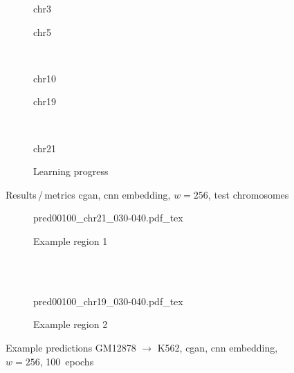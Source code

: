 \begin{figure}[p] %
    \begin{subfigure}{0.45\textwidth}
        \scriptsize
        \caption{chr3}
    \end{subfigure} \hfill
    \begin{subfigure}{0.45\textwidth}
        \scriptsize
        \caption{chr5}
    \end{subfigure}\\[5mm]
    \begin{subfigure}{0.45\textwidth}
        \scriptsize
        \caption{chr10}
    \end{subfigure}\hfill
    \begin{subfigure}{0.45\textwidth}
        \scriptsize
        \caption{chr19}
    \end{subfigure}\\[3mm]
    \centering
    \begin{subfigure}{0.45\textwidth}
        \scriptsize
        \caption{chr21}
    \end{subfigure} \hfill
    \begin{subfigure}{0.45\textwidth}
        \scriptsize
        \caption{Learning progress} \label{fig:results:cGAN256_lossEpochs}
    \end{subfigure}
    \caption{Results\,/\,metrics \acrshort{cgan}, \acrshort{cnn} embedding, $w=256$, test chromosomes}   \label{fig:results:cGAN256_pearson}
\end{figure}
\begin{figure}[p] %
    \begin{subfigure}{\textwidth}
        \centering
        \scriptsize
        {pred00100_chr21_030-040.pdf_tex}
        \caption{Example  region 1} \label{fig:results:cGAN256_r1}
    \end{subfigure}\\[2mm]
    \\[3mm]
    \begin{subfigure}{\textwidth}
        \centering
        \scriptsize
        {pred00100_chr19_030-040.pdf_tex}
        \caption{Example region 2} \label{fig:results:cGAN256_r2}
    \end{subfigure}
    \caption{Example predictions GM12878 $\rightarrow$ K562, \acrshort{cgan}, \acrshort{cnn} embedding, $w=256$, 100~epochs}
\end{figure}
